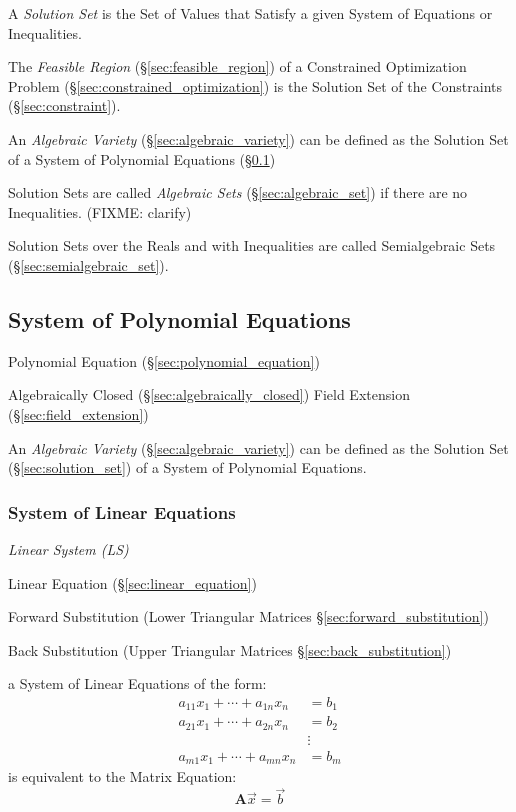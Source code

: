 A \emph{Solution Set} is the Set of Values that Satisfy a given System of
Equations or Inequalities.

The \emph{Feasible Region} (\S\ref{sec:feasible_region}) of a Constrained
Optimization Problem (\S\ref{sec:constrained_optimization}) is the Solution Set
of the Constraints (\S\ref{sec:constraint}).

An \emph{Algebraic Variety} (\S\ref{sec:algebraic_variety}) can be defined as
the Solution Set of a System of Polynomial Equations
(\S\ref{sec:polynomial_equation_system})

Solution Sets are called \emph{Algebraic Sets} (\S\ref{sec:algebraic_set}) if
there are no Inequalities. (FIXME: clarify)

Solution Sets over the Reals and with Inequalities are called Semialgebraic
Sets (\S\ref{sec:semialgebraic_set}).



\subsection{System of Polynomial Equations}
\label{sec:polynomial_equation_system}

Polynomial Equation (\S\ref{sec:polynomial_equation})

Algebraically Closed (\S\ref{sec:algebraically_closed}) Field
Extension (\S\ref{sec:field_extension})

An \emph{Algebraic Variety} (\S\ref{sec:algebraic_variety}) can be defined as
the Solution Set (\S\ref{sec:solution_set}) of a System of Polynomial Equations.



\subsubsection{System of Linear Equations}\label{sec:linear_equation_system}

\emph{Linear System (LS)}

Linear Equation (\S\ref{sec:linear_equation})

Forward Substitution (Lower Triangular Matrices
\S\ref{sec:forward_substitution})

Back Substitution (Upper Triangular Matrices \S\ref{sec:back_substitution})

a System of Linear Equations of the form:
\begin{align*}
  a_{11}x_1 + \cdots + a_{1n}x_n & = b_1 \\
  a_{21}x_1 + \cdots + a_{2n}x_n & = b_2 \\
                                 & \vdots \\
  a_{m1}x_1 + \cdots + a_{mn}x_n & = b_m
\end{align*}
is equivalent to the Matrix Equation:
\[
  \mathbf{A}\vec{x} = \vec{b}
\]

